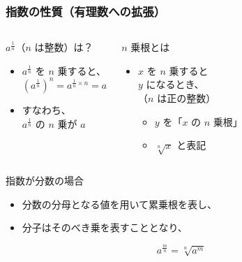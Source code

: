 \documentclass[12pt, dvipdfmx]{beamer}
\begin{document}
\begin{frame}
	\frametitle{指数の性質（有理数への拡張）}
		\begin{columns}[T, onlytextwidth]
				\begin{exampleblock}{$a^{\frac{1}{n}}$（$n$ は整数）は？}
					\begin{itemize}
						\item $a^{\frac{1}{n}}$ を $n$ 乗すると、
							\begin{equation*}
								(a^{\frac{1}{n}})^n=a^{\frac{1}{n} \times n} = a
							\end{equation*}
						\item すなわち、\\ $a^{\frac{1}{n}}$ の $n$ 乗が $a$
					\end{itemize}
				\end{exampleblock}
				\begin{block}{$n$ 乗根とは}
					\begin{itemize}
						\item $x$ を $n$ 乗すると \\$y$ になるとき、\\
						（$n$ は正の整数）
						\begin{itemize}
							\item $y$ を「$x$ の $n$ 乗根」
							\item $\sqrt[n]{x}$ と表記
						\end{itemize}
					\end{itemize}
				\end{block}
		\end{columns}
	\begin{alertblock}{指数が分数の場合}
		\begin{itemize}
			\item 分数の分母となる値を用いて累乗根を表し、
			\item 分子はそのべき乗を表すこととなり、
		\end{itemize}
		\begin{equation*}
		a^{\frac{m}{n}}=\sqrt[n]{a^m}
		\end{equation*}
	\end{alertblock}
\end{frame}
\end{document}
